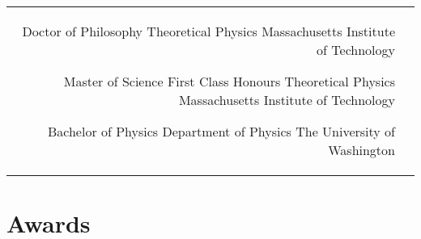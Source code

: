 \documentclass[10pt]{article} %
\begin{document}
\begin{paracol}{2}


\begin{supertabular}{rl} %


	{Doctor of Philosophy} %
	{} %
	{Theoretical Physics} %
	{Massachusetts Institute of Technology} %


	{Master of Science} %
	{First Class Honours} %
	{Theoretical Physics} %
	{Massachusetts Institute of Technology} %


	{Bachelor of Physics} %
	{} %
	{Department of Physics} %
	{The University of Washington} %


\end{supertabular}


\section{Awards}






\end{paracol}
\end{document}
